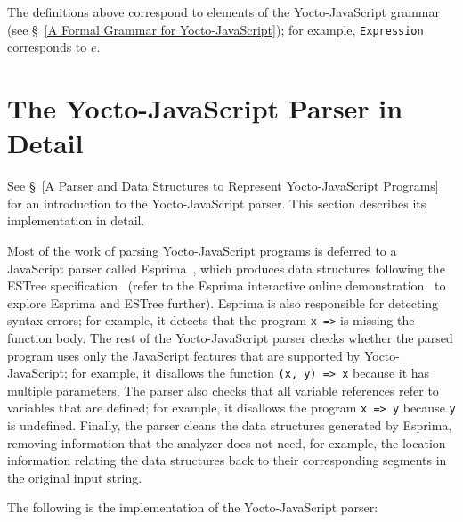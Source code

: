 \documentclass[12pt, oneside]{book}
\begin{document}
The definitions above correspond to elements of the Yocto-JavaScript grammar (see §~\ref{A Formal Grammar for Yocto-JavaScript}); for example, \texttt{Expression} corresponds to $e$.

\chapter{The Yocto-JavaScript Parser in Detail}
\label{The Yocto-JavaScript Parser in Detail}

See §~\ref{A Parser and Data Structures to Represent Yocto-JavaScript Programs} for an introduction to the Yocto-JavaScript parser. This section describes its implementation in detail.

Most of the work of parsing Yocto-JavaScript programs is deferred to a JavaScript parser called Esprima~\cite{esprima}, which produces data structures following the ESTree specification~\cite{estree} (refer to the Esprima interactive online demonstration~\cite{esprima-demonstration} to explore Esprima and ESTree further). Esprima is also responsible for detecting syntax errors; for example, it detects that the program \texttt{x =>} is missing the function body. The rest of the Yocto-JavaScript parser checks whether the parsed program uses only the JavaScript features that are supported by Yocto-JavaScript; for example, it disallows the function \texttt{(x, y) => x} because it has multiple parameters. The parser also checks that all variable references refer to variables that are defined; for example, it disallows the program \texttt{x => y} because \texttt{y} is undefined. Finally, the parser cleans the data structures generated by Esprima, removing information that the analyzer does not need, for example, the location information relating the data structures back to their corresponding segments in the original input string.

The following is the implementation of the Yocto-JavaScript parser:
\end{document}
